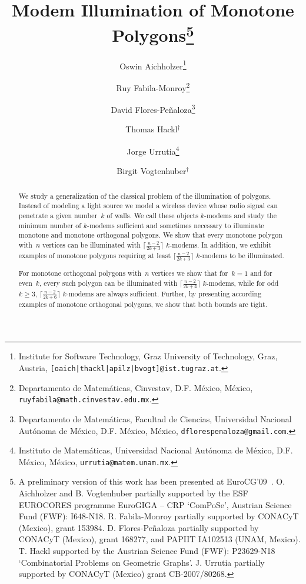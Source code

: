 \documentclass[A4]{article}
\begin{document}
\title{Modem Illumination of Monotone Polygons\thanks{A preliminary version of this work has been presented at EuroCG'09~\cite{Aich}.\newline
O. Aichholzer and B. Vogtenhuber partially supported by the ESF EUROCORES programme EuroGIGA -- CRP `ComPoSe', Austrian Science Fund (FWF): I648-N18. R. Fabila-Monroy partially supported by CONACyT (Mexico), grant 153984. D. Flores-Pe\~naloza partially supported by CONACyT (Mexico), grant 168277, and PAPIIT IA102513 (UNAM, Mexico). T. Hackl supported by the Austrian Science Fund (FWF): P23629-N18 `Combinatorial Problems on Geometric Graphs'. J. Urrutia partially supported by CONACyT (Mexico) grant CB-2007/80268.
  }
 }


\author{Oswin Aichholzer\thanks{Institute for Software Technology, Graz University of Technology, Graz, Austria, \texttt{[oaich|thackl|apilz|bvogt]@ist.tugraz.at}.}
\and Ruy Fabila-Monroy\thanks{Departamento de Matem\'aticas, Cinvestav, D.F. M\'exico, M\'exico, \texttt{ruyfabila@math.cinvestav.edu.mx}.}
\and David Flores-Pe\~naloza\thanks{Departamento de Matem\'aticas, Facultad de Ciencias, Universidad Nacional Aut\'onoma de M\'exico, D.F. M\'exico, M\'exico, \texttt{dflorespenaloza@gmail.com}.}
\and Thomas Hackl$^\dagger$
\and Jorge Urrutia\thanks{Instituto de Matem\'aticas, Universidad Nacional Aut\'onoma de M\'exico, D.F. M\'exico, M\'exico, \texttt{urrutia@matem.unam.mx}.}
\and Birgit Vogtenhuber$^\dagger$
}


\maketitle


\begin{abstract}
  We study a generalization of the classical problem of the illumination of polygons.
  Instead of modeling a light source we model a wireless device whose radio signal can penetrate a given number~$k$ of walls.
  We call these objects \mbox{$k$-modems} and study the minimum number of \mbox{$k$-modems} sufficient and sometimes necessary to illuminate monotone and monotone orthogonal polygons.
  We show that every monotone polygon with~$n$ vertices can be illuminated with $\big\lceil \frac{n-2}{2k+3} \big\rceil$ \mbox{$k$-modems}.
  In addition, we exhibit examples of monotone polygons requiring at least $\lceil \frac {n-2} {2k+3}\rceil$ \mbox{$k$-modems} to be illuminated.

  For monotone orthogonal polygons with~$n$ vertices we show that for~$k=1$ and for even~$k$, every such polygon can be illuminated with $\big\lceil \frac{n-2}{2k+4} \big\rceil$ \mbox{$k$-modems}, while for odd~$k\geq3$, $\big\lceil \frac{n-2}{2k+6} \big\rceil$ $k$-modems are always sufficient.
  Further, by presenting according examples of monotone orthogonal polygons, we show that both bounds are tight.
\end{abstract}
\end{document}
